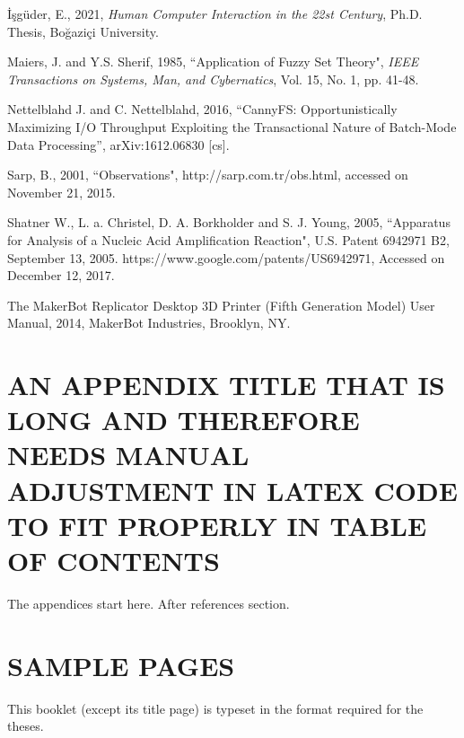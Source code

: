 \documentclass[a4paper,oneside,12pt]{report}
\numberwithin{equation}{chapter}
\begin{document}
\leftskip 5mm \parindent -5mm İşgüder, E., 2021, \textit{Human Computer Interaction in the 22st Century}, Ph.D. Thesis, Boğaziçi University.

\leftskip 5mm \parindent -5mm Maiers, J. and Y.S. Sherif, 1985, ``Application of Fuzzy Set Theory", \textit{IEEE Transactions on Systems, Man, and Cybernatics}, Vol. 15, No. 1, pp. 41-48.

\leftskip 5mm \parindent -5mm Nettelblahd J. and C. Nettelblahd, 2016, “CannyFS: Opportunistically Maximizing I/O Throughput Exploiting the Transactional Nature of Batch-Mode Data Processing”, arXiv:1612.06830 [cs].

\leftskip 5mm \parindent -5mm Sarp, B., 2001, ``Observations", http://sarp.com.tr/obs.html, accessed on November 21, 2015.

\leftskip 5mm \parindent -5mm Shatner W., L. a. Christel, D. A. Borkholder and S. J. Young, 2005, ``Apparatus for Analysis of a Nucleic Acid Amplification Reaction", U.S. Patent 6942971 B2, September 13, 2005. https://www.google.com/patents/US6942971, Accessed on December 12, 2017.

\leftskip 5mm \parindent -5mm The MakerBot Replicator Desktop 3D Printer (Fifth Generation Model) User Manual, 2014, MakerBot Industries, Brooklyn, NY.




\appendix
\chapter[AN APPENDIX TITLE THAT IS LONG AND THEREFORE\\
	\hspace*{2.95cm} NEEDS MANUAL ADJUSTMENT IN LATEX CODE TO FIT\\
	\hspace*{2.95cm} PROPERLY IN TABLE OF CONTENTS]{AN APPENDIX TITLE THAT IS LONG AND THEREFORE NEEDS MANUAL ADJUSTMENT IN LATEX CODE TO FIT PROPERLY IN TABLE OF CONTENTS}
	
The appendices start here. After references section.



\chapter{SAMPLE PAGES}
This booklet (except its title page) is typeset in the
format required for the theses. 
\end{document}
